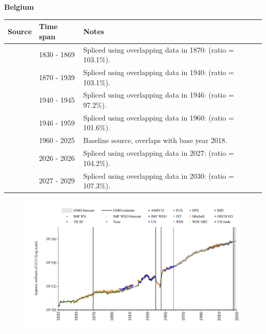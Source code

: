 \documentclass[12pt,a4paper,landscape]{article}
\begin{document}
\begin{adjustbox}{max totalsize={\paperwidth}{\paperheight},center}
\begin{minipage}[t][\textheight][t]{\textwidth}
\vspace*{0.5cm}
{}
\begin{center}
{\Large\bfseries Belgium}
\end{center}
\vspace{0.5cm}
\begin{table}[H]
\centering
\small
\begin{tabular}{|l|l|l|}
\hline
\textbf{Source} & \textbf{Time span} & \textbf{Notes} \\
\hline
\rowcolor{white}\cite{Tena}& 1830 - 1869 &Spliced using overlapping data in 1870: (ratio = 103.1\%).\\
\rowcolor{lightgray}\cite{JST}& 1870 - 1939 &Spliced using overlapping data in 1940: (ratio = 103.1\%).\\
\rowcolor{white}\cite{Mitchell}& 1940 - 1945 &Spliced using overlapping data in 1946: (ratio = 97.2\%).\\
\rowcolor{lightgray}\cite{JST}& 1946 - 1959 &Spliced using overlapping data in 1960: (ratio = 101.6\%).\\
\rowcolor{white}\cite{OECD_EO}& 1960 - 2025 &Baseline source, overlaps with base year 2018.\\
\rowcolor{lightgray}\cite{AMECO}& 2026 - 2026 &Spliced using overlapping data in 2027: (ratio = 104.2\%).\\
\rowcolor{white}\cite{IMF_WEO_forecast}& 2027 - 2029 &Spliced using overlapping data in 2030: (ratio = 107.3\%).\\
\hline
\end{tabular}
\end{table}
\begin{figure}[H]
\centering
\includegraphics[width=\textwidth,height=0.6\textheight,keepaspectratio]{graphs/BEL_imports.pdf}
\end{figure}
\end{minipage}
\end{adjustbox}
\end{document}
